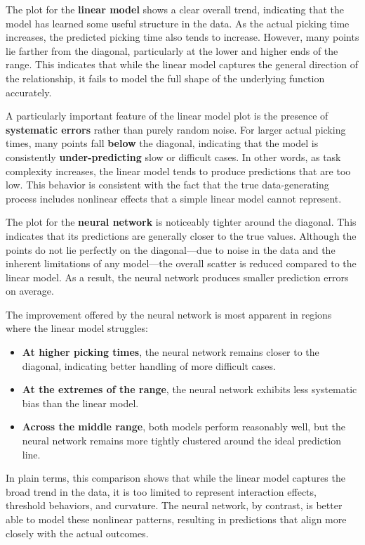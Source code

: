 \documentclass[10pt,twocolumn]{article}
\begin{document}
The plot for the \textbf{linear model} shows a clear overall trend, indicating that the model has learned some useful structure in the data. As the actual picking time increases, the predicted picking time also tends to increase. However, many points lie farther from the diagonal, particularly at the lower and higher ends of the range. This indicates that while the linear model captures the general direction of the relationship, it fails to model the full shape of the underlying function accurately.

A particularly important feature of the linear model plot is the presence of \textbf{systematic errors} rather than purely random noise. For larger actual picking times, many points fall \textbf{below} the diagonal, indicating that the model is consistently \textbf{under-predicting} slow or difficult cases. In other words, as task complexity increases, the linear model tends to produce predictions that are too low. This behavior is consistent with the fact that the true data-generating process includes nonlinear effects that a simple linear model cannot represent.

The plot for the \textbf{neural network} is noticeably tighter around the diagonal. This indicates that its predictions are generally closer to the true values. Although the points do not lie perfectly on the diagonal—due to noise in the data and the inherent limitations of any model—the overall scatter is reduced compared to the linear model. As a result, the neural network produces smaller prediction errors on average.

The improvement offered by the neural network is most apparent in regions where the linear model struggles:

\begin{itemize}
  \item \textbf{At higher picking times}, the neural network remains closer to the diagonal, indicating better handling of more difficult cases.
  \item \textbf{At the extremes of the range}, the neural network exhibits less systematic bias than the linear model.
  \item \textbf{Across the middle range}, both models perform reasonably well, but the neural network remains more tightly clustered around the ideal prediction line.
\end{itemize}

In plain terms, this comparison shows that while the linear model captures the broad trend in the data, it is too limited to represent interaction effects, threshold behaviors, and curvature. The neural network, by contrast, is better able to model these nonlinear patterns, resulting in predictions that align more closely with the actual outcomes.
\end{document}
